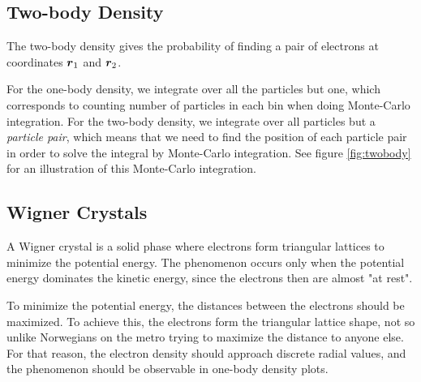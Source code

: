 \subsection{Two-body Density}
The two-body density gives the probability of finding a pair of electrons at coordinates $\boldsymbol{{r}}_1$ and $\boldsymbol{{r}}_2$. 

For the one-body density, we integrate over all the particles but one, which corresponds to counting number of particles in each bin when doing Monte-Carlo integration. For the two-body density, we integrate over all particles but a \textit{particle pair}, which means that we need to find the position of each particle pair in order to solve the integral by Monte-Carlo integration. See figure \eqref{fig:twobody} for an illustration of this Monte-Carlo integration.

\subsection{Wigner Crystals} \label{sec:wigner}
A Wigner crystal is a solid phase where electrons form triangular lattices to minimize the potential energy. The phenomenon occurs only when the potential energy dominates the kinetic energy, since the electrons then are almost "at rest". 

To minimize the potential energy, the distances between the electrons should be maximized. To achieve this, the electrons form the triangular lattice shape, not so unlike Norwegians on the metro trying to maximize the distance to anyone else. For that reason, the electron density should approach discrete radial values, and the phenomenon should be observable in one-body density plots.


